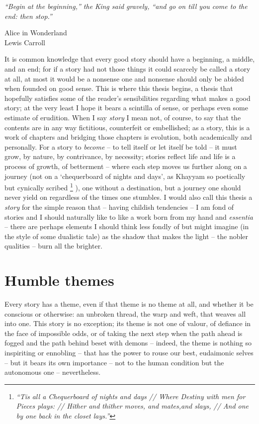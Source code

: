 \epigraph{
    \emph{
        ``Begin at the beginning,'' the King said gravely, ``and go on till you come to the end:
        then stop.''
} 
%
}
{Alice in Wonderland\\Lewis Carroll}
%
\noindent It is common knowledge that every good story should have a beginning, a middle, and an
end; for if a story had not those things it could scarcely be called a story at all, at most it
would be a nonsense one and nonsense should only be abided when founded on good sense.
%
This is where this thesis begins, a thesis that hopefully satisfies some of the reader's
sensibilities regarding what makes a good story; at the very least I hope it bears a scintilla of
sense, or perhaps even some estimate of erudition.
%
When I say \emph{story} I mean not, of course, to say that the contents are in any way
fictitious, counterfeit or embellished; as a story, this is a work of chapters and
bridging those chapters is evolution, both academically and personally.
%
For a story to \emph{become} -- to tell itself or let itself be told -- it must grow, by nature, by
contrivance, by necessity; stories reflect life and life is a process of growth, of betterment --
where each step moves us further along on a journey (not on a `chequerboard of nights and days', as
Khayyam so poetically but cynically scribed
%
\footnote{
    \emph{
        “Tis all a Chequerboard of nights and days //
        Where Destiny with men for Pieces plays: //
        Hither and thither moves, and mates,and slays, //
        And one by one back in the closet lays.”
    }
}
%
), one without a destination, but a journey one should
never yield on regardless of the times one stumbles.
%
I would also call this thesis a \emph{story} for the simple reason that -- having childish
tendencies -- I am fond of stories and I should naturally like to like a work born from my hand and
\emph{essentia} -- there are perhaps elements I should think less fondly of but might imagine (in
the style of some dualistic tale) as the shadow that makes the light -- the nobler qualities --
burn all the brighter.

%
\section{Humble themes}\label{sec:themes}
%
Every story has a theme, even if that theme is no theme at all, and whether it be conscious or
otherwise: an unbroken thread, the warp and weft, that weaves all into one.
%
This story is no exception; its theme is not one of valour, of defiance in the face of impossible
odds, or of taking the next step when the path ahead is fogged and the path behind beset with
demons -- indeed, the theme is nothing so inspiriting or ennobling -- that has the power to rouse
our best, eudaimonic selves -- but it bears its own importance -- not to the human condition but
the autonomous one -- nevertheless.

